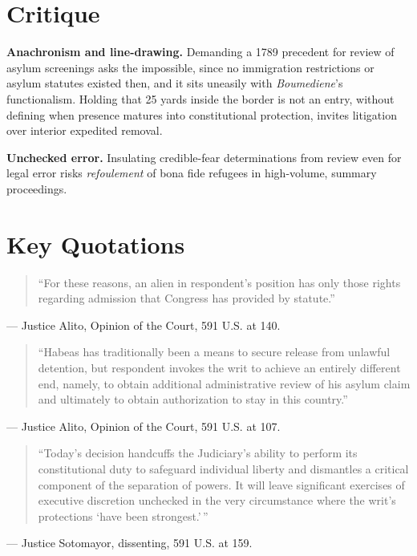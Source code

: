 \documentclass[12pt]{article}
\begin{document}
\section{Critique}

\textbf{Anachronism and line-drawing.} Demanding a 1789 precedent for review of asylum screenings asks the impossible, since no immigration restrictions or asylum statutes existed then, and it sits uneasily with \textit{Boumediene}'s functionalism. Holding that 25 yards inside the border is not an entry, without defining when presence matures into constitutional protection, invites litigation over interior expedited removal.

\textbf{Unchecked error.} Insulating credible-fear determinations from review even for legal error risks \textit{refoulement} of bona fide refugees in high-volume, summary proceedings.

\section{Key Quotations}

\begin{quote}
``For these reasons, an alien in respondent's position has only those rights regarding admission that Congress has provided by statute.''
\end{quote}
\noindent --- Justice Alito, Opinion of the Court, 591 U.S. at 140.

\begin{quote}
``Habeas has traditionally been a means to secure release from unlawful detention, but respondent invokes the writ to achieve an entirely different end, namely, to obtain additional administrative review of his asylum claim and ultimately to obtain authorization to stay in this country.''
\end{quote}
\noindent --- Justice Alito, Opinion of the Court, 591 U.S. at 107.

\begin{quote}
``Today's decision handcuffs the Judiciary's ability to perform its constitutional duty to safeguard individual liberty and dismantles a critical component of the separation of powers. It will leave significant exercises of executive discretion unchecked in the very circumstance where the writ's protections `have been strongest.'\,''
\end{quote}
\noindent --- Justice Sotomayor, dissenting, 591 U.S. at 159.
\end{document}
